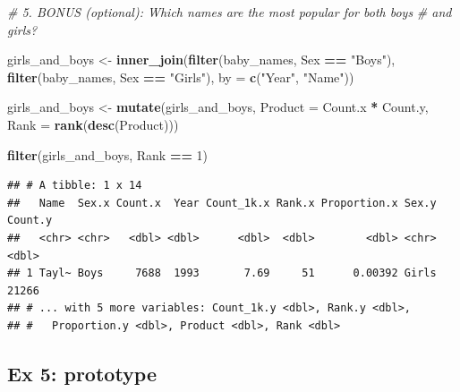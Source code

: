 \documentclass[]{book}
\newenvironment{Shaded}{\begin{snugshade}}{\end{snugshade}}
\newcommand{\CommentTok}[1]{\textcolor[rgb]{0.56,0.35,0.01}{\textit{#1}}}
\newcommand{\DataTypeTok}[1]{\textcolor[rgb]{0.13,0.29,0.53}{#1}}
\newcommand{\DecValTok}[1]{\textcolor[rgb]{0.00,0.00,0.81}{#1}}
\newcommand{\KeywordTok}[1]{\textcolor[rgb]{0.13,0.29,0.53}{\textbf{#1}}}
\newcommand{\NormalTok}[1]{#1}
\newcommand{\OperatorTok}[1]{\textcolor[rgb]{0.81,0.36,0.00}{\textbf{#1}}}
\newcommand{\StringTok}[1]{\textcolor[rgb]{0.31,0.60,0.02}{#1}}
\begin{document}
\begin{Shaded}
\begin{Highlighting}[]
\CommentTok{# 5. BONUS (optional): Which names are the most popular for both boys }
\CommentTok{#    and girls?}

\NormalTok{girls_and_boys <-}\StringTok{ }\KeywordTok{inner_join}\NormalTok{(}\KeywordTok{filter}\NormalTok{(baby_names, Sex }\OperatorTok{==}\StringTok{ "Boys"}\NormalTok{), }
                             \KeywordTok{filter}\NormalTok{(baby_names, Sex }\OperatorTok{==}\StringTok{ "Girls"}\NormalTok{),}
                             \DataTypeTok{by =} \KeywordTok{c}\NormalTok{(}\StringTok{"Year"}\NormalTok{, }\StringTok{"Name"}\NormalTok{))}

\NormalTok{girls_and_boys <-}\StringTok{ }\KeywordTok{mutate}\NormalTok{(girls_and_boys,}
                         \DataTypeTok{Product =}\NormalTok{ Count.x }\OperatorTok{*}\StringTok{ }\NormalTok{Count.y,}
                         \DataTypeTok{Rank =} \KeywordTok{rank}\NormalTok{(}\KeywordTok{desc}\NormalTok{(Product)))}

\KeywordTok{filter}\NormalTok{(girls_and_boys, Rank }\OperatorTok{==}\StringTok{ }\DecValTok{1}\NormalTok{)}
\end{Highlighting}
\end{Shaded}

\begin{verbatim}
## # A tibble: 1 x 14
##   Name  Sex.x Count.x  Year Count_1k.x Rank.x Proportion.x Sex.y Count.y
##   <chr> <chr>   <dbl> <dbl>      <dbl>  <dbl>        <dbl> <chr>   <dbl>
## 1 Tayl~ Boys     7688  1993       7.69     51      0.00392 Girls   21266
## # ... with 5 more variables: Count_1k.y <dbl>, Rank.y <dbl>,
## #   Proportion.y <dbl>, Product <dbl>, Rank <dbl>
\end{verbatim}

\hypertarget{ex-5-prototype}{%
\subsection{Ex 5: prototype}\label{ex-5-prototype}}

\begin{Shaded}
\end{Shaded}
\end{document}
